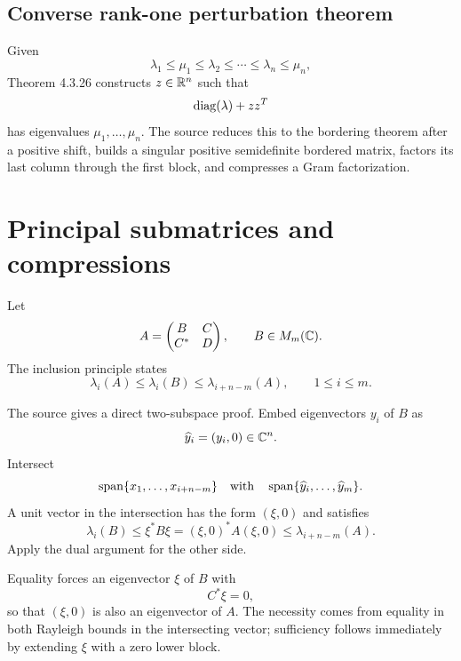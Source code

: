 \subsection{Converse rank-one perturbation theorem}

Given
\[
  \lambda_1\le\mu_1\le\lambda_2\le\cdots\le\lambda_n\le\mu_n,
\]
Theorem 4.3.26 constructs $z\in\mathbb{R}^n$ such that
\[
  \operatorname{diag}(\lambda)+zz^T
\]
has eigenvalues $\mu_1,\dots,\mu_n$. The source reduces this to the bordering theorem after a positive shift, builds a singular positive semidefinite bordered matrix, factors its last column through the first block, and compresses a Gram factorization.


\section{Principal submatrices and compressions}


Let
\[
  A=\begin{pmatrix}B&C\\C^*&D\end{pmatrix},
  \qquad B\in M_m(\mathbb{C}).
\]
The inclusion principle states
\begin{equation}
  \lambda_i(A)\le\lambda_i(B)\le\lambda_{i+n-m}(A),
  \qquad 1\le i\le m. \tag{HJ-inclusion}
\end{equation}

The source gives a direct two-subspace proof. Embed eigenvectors $y_i$ of $B$ as
\[
  \widehat y_i=(y_i,0)\in\mathbb{C}^n.
\]
Intersect
\[
  \operatorname{span}\{x_1,\dots,x_{i+n-m}\}
  \quad\text{with}\quad
  \operatorname{span}\{\widehat y_i,\dots,\widehat y_m\}.
\]
A unit vector in the intersection has the form $(\xi,0)$ and satisfies
\[
  \lambda_i(B)\le \xi^*B\xi=(\xi,0)^*A(\xi,0)
  \le\lambda_{i+n-m}(A).
\]
Apply the dual argument for the other side.

Equality forces an eigenvector $\xi$ of $B$ with
\[
  C^*\xi=0,
\]
so that $(\xi,0)$ is also an eigenvector of $A$. The necessity comes from equality in both Rayleigh bounds in the intersecting vector; sufficiency follows immediately by extending $\xi$ with a zero lower block.

